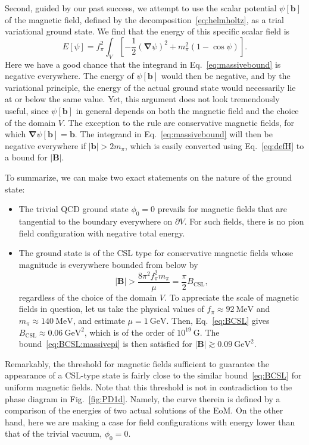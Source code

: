 \documentclass[pdflatex,iicol,sn-mathphys-num]{sn-jnl}
\let\m=\mu
\let\p=\phi
\let\de=\partial
\newcommand{\vek}[1]{\bm{#1}}%
\newcommand{\grad}{\vek\nabla}%
\newcommand{\bmag}{b}%
\begin{document}
Second, guided by our past success, we attempt to use the scalar potential $\psi[\vek\bmag]$ of the magnetic field, defined by the decomposition~\eqref{eq:helmholtz}, as a trial variational ground state. We find that the energy of this specific scalar field is
\begin{equation}
E[\psi]=f_\pi^2\int_V\left[-\frac12(\grad\psi)^2+m_\pi^2(1-\cos\psi)\right].
\label{eq:massivebound}
\end{equation}
Here we have a good chance that the integrand in Eq.~\eqref{eq:massivebound} is negative everywhere. The energy of $\psi[\vek\bmag]$ would then be negative, and by the variational principle, the energy of the actual ground state would necessarily lie at or below the same value. Yet, this argument does not look tremendously useful, since $\psi[\vek\bmag]$ in general depends on both the magnetic field and the choice of the domain $V$. The exception to the rule are conservative magnetic fields, for which $\grad\psi[\vek\bmag]=\vek\bmag$. The integrand in Eq.~\eqref{eq:massivebound} will then be negative everywhere if $|\vek\bmag|>2m_\pi$, which is easily converted using Eq.~\eqref{eq:defH} to a bound for $|\vek B|$.

To summarize, we can make two exact statements on the nature of the ground state:
\begin{itemize}
\item The trivial QCD ground state $\p_0=0$ prevails for magnetic fields that are tangential to the boundary everywhere on $\de V$. For such fields, there is no pion field configuration with negative total energy.
\item The ground state is of the CSL type for conservative magnetic fields whose magnitude is everywhere bounded from below by
\begin{equation}
|\vek B|>\frac{8\pi^2f_\pi^2m_\pi}{\m}=\frac\pi2B_\text{CSL},
\label{eq:BCSL:massivepi}
\end{equation}
regardless of the choice of the domain $V$. To appreciate the scale of magnetic fields in question, let us take the physical values of $f_\pi\approx92~\text{MeV}$ and $m_\pi\approx140~\text{MeV}$, and estimate $\mu=1~\text{GeV}$. Then, Eq.~\eqref{eq:BCSL} gives $B_\text{CSL}\approx0.06~\text{GeV}^{2}$, which is of the order of $10^{19}~\text{G}$. The bound~\eqref{eq:BCSL:massivepi} is then satisfied for $|\vek B|\gtrsim0.09~\text{GeV}^{2}$.
\end{itemize}
Remarkably, the threshold for magnetic fields sufficient to guarantee the appearance of a CSL-type state is fairly close to the similar bound~\eqref{eq:BCSL} for uniform magnetic fields. Note that this threshold is not in contradiction to the phase diagram in Fig.~\ref{fig:PD1d}. Namely, the curve therein is defined by a comparison of the energies of two actual solutions of the EoM. On the other hand, here we are making a case for field configurations with energy lower than that of the trivial vacuum, $\p_0=0$.
\end{document}

